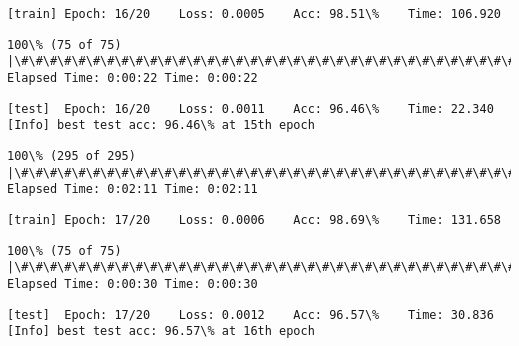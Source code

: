 \documentclass[11pt]{article}
\begin{document}
    \begin{Verbatim}[commandchars=\\\{\}]
[train]	Epoch: 16/20	Loss: 0.0005	Acc: 98.51\%	Time: 106.920

    \end{Verbatim}

    \begin{Verbatim}[commandchars=\\\{\}]
100\% (75 of 75) |\#\#\#\#\#\#\#\#\#\#\#\#\#\#\#\#\#\#\#\#\#\#\#\#\#\#\#\#\#\#\#\#\#\#\#\#\#\#\#\#\#\#\#\#\#\#\#\#\#\#\#\#\#\#\#\#\#\#\#\#\#\#\#\#\#| Elapsed Time: 0:00:22 Time: 0:00:22

    \end{Verbatim}

    \begin{Verbatim}[commandchars=\\\{\}]
[test]	Epoch: 16/20	Loss: 0.0011	Acc: 96.46\%	Time: 22.340
[Info] best test acc: 96.46\% at 15th epoch

    \end{Verbatim}

    \begin{Verbatim}[commandchars=\\\{\}]
100\% (295 of 295) |\#\#\#\#\#\#\#\#\#\#\#\#\#\#\#\#\#\#\#\#\#\#\#\#\#\#\#\#\#\#\#\#\#\#\#\#\#\#\#\#\#\#\#\#\#\#\#\#\#\#\#\#\#\#\#\#\#\#\#\#\#\#\#| Elapsed Time: 0:02:11 Time: 0:02:11

    \end{Verbatim}

    \begin{Verbatim}[commandchars=\\\{\}]
[train]	Epoch: 17/20	Loss: 0.0006	Acc: 98.69\%	Time: 131.658

    \end{Verbatim}

    \begin{Verbatim}[commandchars=\\\{\}]
100\% (75 of 75) |\#\#\#\#\#\#\#\#\#\#\#\#\#\#\#\#\#\#\#\#\#\#\#\#\#\#\#\#\#\#\#\#\#\#\#\#\#\#\#\#\#\#\#\#\#\#\#\#\#\#\#\#\#\#\#\#\#\#\#\#\#\#\#\#\#| Elapsed Time: 0:00:30 Time: 0:00:30

    \end{Verbatim}

    \begin{Verbatim}[commandchars=\\\{\}]
[test]	Epoch: 17/20	Loss: 0.0012	Acc: 96.57\%	Time: 30.836
[Info] best test acc: 96.57\% at 16th epoch

    \end{Verbatim}
\end{document}

